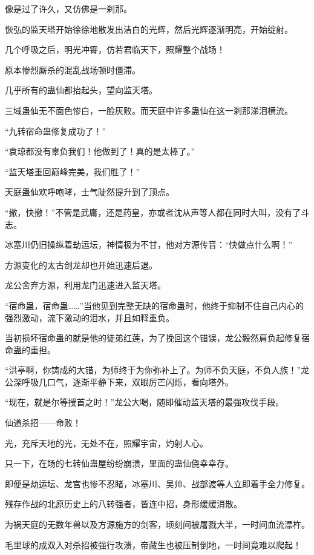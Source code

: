 
\begin{this_body}

像是过了许久，又仿佛是一刹那。

恢弘的监天塔开始徐徐地散发出洁白的光辉，然后光辉逐渐明亮，开始绽射。

几个呼吸之后，明光冲霄，仿若君临天下，照耀整个战场！

原本惨烈厮杀的混乱战场顿时僵滞。

几乎所有的蛊仙都抬起头，望向监天塔。

三域蛊仙无不面色惨白，一脸灰败。而天庭中许多蛊仙在这一刹那涕泪横流。

“九转宿命蛊修复成功了！”

“袁琼都没有辜负我们！他做到了！真的是太棒了。”

“监天塔重回巅峰完美，我们胜了！”

天庭蛊仙欢呼咆哮，士气陡然提升到了顶点。

“撤，快撤！”不管是武庸，还是药皇，亦或者沈从声等人都在同时大叫，没有了斗志。

冰塞川仍旧操纵着劫运坛，神情极为不甘，他对方源传音：“快做点什么啊！”

方源变化的太古剑龙却也开始迅速后退。

龙公舍弃方源，利用龙门迅速进入监天塔。

“宿命蛊，宿命蛊……”当他见到完整无缺的宿命蛊时，他终于抑制不住自己内心的强烈激动，流下激动的泪水，并且如释重负。

当初损坏宿命蛊的就是他的徒弟红莲，为了挽回这个错误，龙公毅然肩负起修复宿命蛊的重担。

“洪亭啊，你铸成的大错，为师终于为你弥补上了。为师不负天庭，不负人族！”龙公深呼吸几口气，逐渐平静下来，双眼厉芒闪烁，看向塔外。

“现在，就是尔等授首之时！”龙公大喝，随即催动监天塔的最强攻伐手段。

仙道杀招——命败！

光，充斥天地的光，无处不在，照耀宇宙，灼射人心。

只一下，在场的七转仙蛊屋纷纷崩溃，里面的蛊仙侥幸幸存。

即便是劫运坛、龙宫也惨不忍睹，冰塞川、吴帅、战部渡等人立即着手全力修复。

残存作战的北原历史上的八转强者，皆连中招，身形缓缓消散。

为祸天庭的无数年兽以及方源施方的剑客，顷刻间被屠戮大半，一时间血流漂杵。

毛里球的成双入对杀招被强行攻溃，帝藏生也被压制倒地，一时间竟难以爬起！


\end{this_body}
